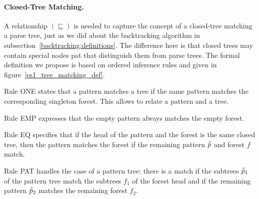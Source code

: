 \paragraph{Closed\hyp{}Tree Matching.}

A relationship \((\sqsubseteq)\) is needed to capture the concept of a
closed\hyp{}tree matching a parse tree, just as we did about the
backtracking algorithm in
sub\-section~\ref{backtracking:definitions}. The difference here is
that closed trees may contain special nodes \textsf{pat} that
distinguish them from parse trees. The formal definition we propose is
based on ordered inference rules and given in
figure~\ref{es1_tree_matching_def}.

Rule \textsf{ONE} states that a pattern matches a tree if the same
pattern matches the corresponding singleton forest. This allows to
relate a pattern and a tree.

Rule \textsf{EMP} expresses that the empty pattern always matches the
empty forest.

Rule \textsf{EQ} specifies that if the head of the pattern and the
forest is the same closed tree, then the pattern matches the forest if
the remaining pattern \(\accentset{\circ}{p}\) and forest \(f\) match.

Rule \textsf{PAT} handles the case of a pattern tree: there is a match
if the subtrees \(\accentset{\circ}{p}_1\) of the pattern tree match the subtrees
\(f_1\) of the forest head and if the remaining pattern
\(\accentset{\circ}{p}_2\) matches the remaining forest \(f_2\).

